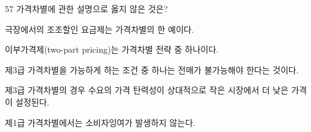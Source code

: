 \begin{question}{57}
가격차별에 관한 설명으로 옳지 않은 것은?
\begin{choices}
  \item 극장에서의 조조할인 요금제는 가격차별의 한 예이다.
  \item 이부가격제(two-part pricing)는 가격차별 전략 중 하나이다.
  \item 제3급 가격차별을 가능하게 하는 조건 중 하나는 전매가 불가능해야 한다는 것이다.
  \item 제3급 가격차별의 경우 수요의 가격 탄력성이 상대적으로 작은 시장에서 더 낮은 가격이 설정된다.
  \item 제1급 가격차별에서는 소비자잉여가 발생하지 않는다.
\end{choices}
\end{question}
